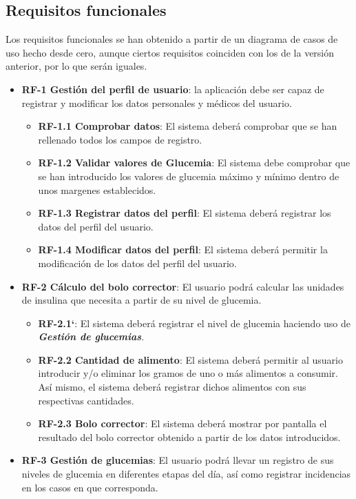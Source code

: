 \subsection{Requisitos funcionales}
Los requisitos funcionales se han obtenido a partir de un diagrama de casos de uso hecho desde cero, aunque ciertos requisitos coinciden con los de la versión anterior, por lo que serán iguales.
\begin{itemize}
	\item \textbf{RF-1 Gestión del perfil de usuario}: la aplicación debe ser capaz de registrar y modificar los datos personales y médicos del usuario.
		\begin{itemize}
			\item \textbf{RF-1.1 Comprobar datos}: El sistema deberá comprobar que se han rellenado todos los campos de registro.
			\item \textbf{RF-1.2 Validar valores de Glucemia}: El sistema debe comprobar que se han introducido los valores de glucemia máximo y mínimo dentro de unos margenes establecidos.
			\item \textbf{RF-1.3 Registrar datos del perfil}: El sistema deberá registrar los datos del perfil del usuario.
			\item \textbf{RF-1.4 Modificar datos del perfil}: El sistema deberá permitir la modificación de los datos del perfil del usuario.
		\end{itemize}
	\item \textbf{RF-2 Cálculo del bolo corrector}: El usuario podrá calcular las unidades de insulina que necesita a partir de su nivel de glucemia.
		\begin{itemize}
			\item \textbf{RF-2.1`}: El sistema deberá registrar el nivel de glucemia haciendo uso de \textbf{\textit{Gestión de glucemias}}.
			\item \textbf{RF-2.2 Cantidad de alimento}: El sistema deberá permitir al usuario introducir y/o eliminar los gramos de uno o más alimentos a consumir. Así mismo, el sistema deberá registrar dichos alimentos con sus respectivas cantidades.
			\item \textbf{RF-2.3 Bolo corrector}: El sistema deberá mostrar por pantalla el resultado del bolo corrector obtenido a partir de los datos introducidos.
		\end{itemize}
	\item \textbf{RF-3 Gestión de glucemias}: El usuario podrá llevar un registro de sus niveles de glucemia en diferentes etapas del día, así como registrar incidencias en los casos en que corresponda.

\end{itemize}
